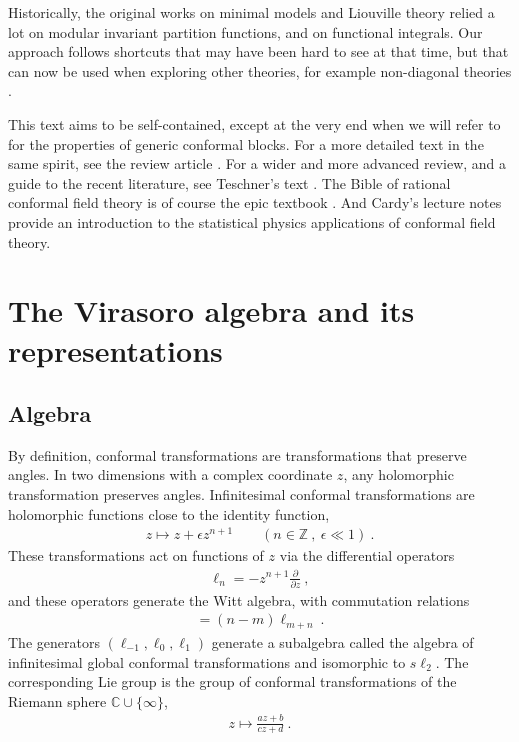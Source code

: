 \documentclass[12pt, a4paper]{article}
\theoremstyle{break}
\begin{document}
Historically, the original works on minimal models and Liouville theory relied a lot on modular invariant partition functions, and on functional integrals. Our approach follows shortcuts that may have been hard to see at that time, but that can now be used when exploring other theories, for example non-diagonal theories \cite{mr17}. 

This text  aims to be self-contained, except at the very end when we will refer to \cite{zz90} for the properties of generic conformal blocks.
For a more detailed text in the same spirit, see the review article \cite{rib14}. For a wider and more advanced review, and a guide to the recent literature, see Teschner's text \cite{tes17}. 
The Bible of rational conformal field theory is of course the epic textbook \cite{fms97}. And Cardy's lecture notes \cite{car08} provide an introduction to the statistical physics applications of conformal field theory.


\section{The Virasoro algebra and its representations}

\subsection{Algebra}

By definition, conformal transformations are transformations that preserve angles. 
In two dimensions with a complex coordinate $z$, any holomorphic transformation preserves angles.
Infinitesimal conformal transformations are holomorphic functions close to the identity function, 
\begin{align}
 z \mapsto z + \epsilon z^{n+1}\qquad (n\in\mathbb{Z}\ , \ \epsilon\ll 1) \ .
\end{align}
These transformations act on functions of $z$ via the differential operators 
\begin{align}
 \ell_n = -z^{n+1}\frac{\partial}{\partial z}\ ,
\end{align}
and these operators generate the Witt algebra, with commutation relations
\begin{align}
 [\ell_n,\ell_m ] = (n-m)\ell_{m+n}\ .
\end{align}
The generators $(\ell_{-1},\ell_0,\ell_1)$ generate a subalgebra called the algebra of infinitesimal global conformal transformations and isomorphic to $s\ell_2$.  The corresponding Lie group is the group of conformal transformations of 
the Riemann sphere $\mathbb{C}\cup \{\infty\}$,
\begin{align}
 z \mapsto \frac{az+b}{cz+d}\ .
\end{align}
\end{document}

